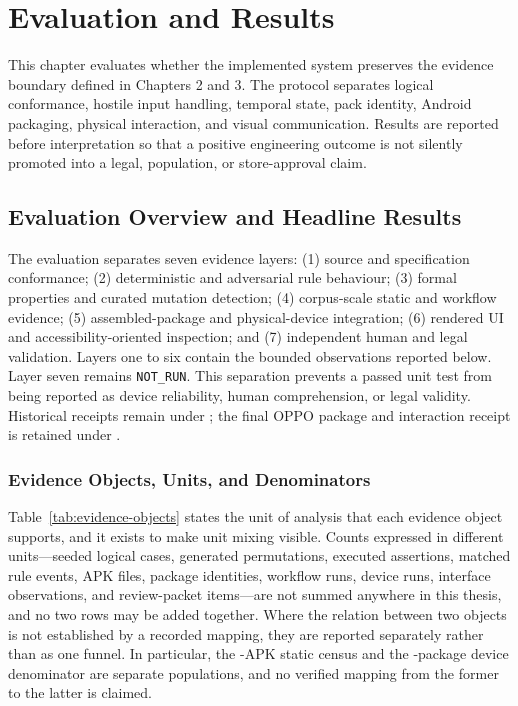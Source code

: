 \chapter{Evaluation and Results}

This chapter evaluates whether the implemented system preserves the evidence boundary defined in Chapters 2 and 3. The protocol separates logical conformance, hostile input handling, temporal state, pack identity, Android packaging, physical interaction, and visual communication. Results are reported before interpretation so that a positive engineering outcome is not silently promoted into a legal, population, or store-approval claim.

\section{Evaluation Overview and Headline Results}

The evaluation separates seven evidence layers: (1) source and specification conformance; (2) deterministic and adversarial rule behaviour; (3) formal properties and curated mutation detection; (4) corpus-scale static and workflow evidence; (5) assembled-package and physical-device integration; (6) rendered UI and accessibility-oriented inspection; and (7) independent human and legal validation. Layers one to six contain the bounded observations reported below. Layer seven remains \texttt{NOT\_RUN}. This separation prevents a passed unit test from being reported as device reliability, human comprehension, or legal validity. Historical receipts remain under ; the final OPPO package and interaction receipt is retained under .

\subsection{Evidence Objects, Units, and Denominators}

Table~\ref{tab:evidence-objects} states the unit of analysis that each evidence object supports, and it exists to make unit mixing visible. Counts expressed in different units---seeded logical cases, generated permutations, executed assertions, matched rule events, APK files, package identities, workflow runs, device runs, interface observations, and review-packet items---are not summed anywhere in this thesis, and no two rows may be added together. Where the relation between two objects is not established by a recorded mapping, they are reported separately rather than as one funnel. In particular, the \FDroidCensusN{}-APK static census and the \DevicePackagesN{}-package device denominator are separate populations, and no verified mapping from the former to the latter is claimed.

